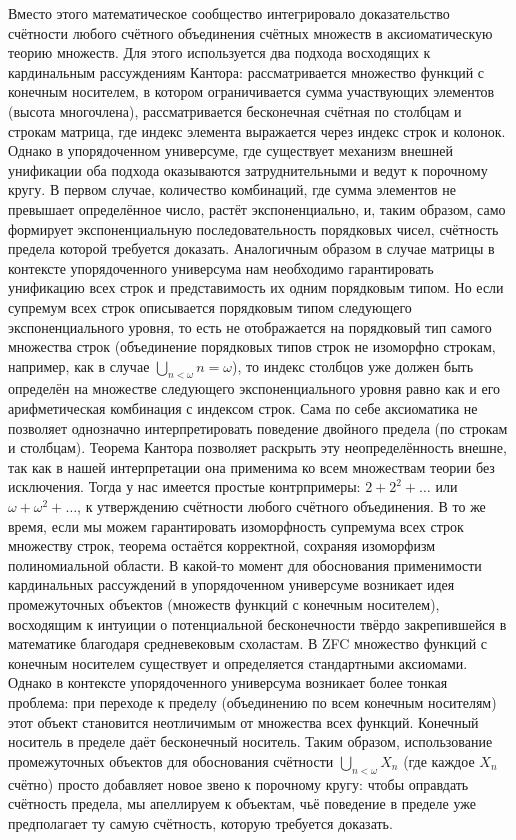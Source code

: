 \documentclass[12pt]{article}
\begin{document}
Вместо этого математическое сообщество интегрировало доказательство счётности любого счётного объединения счётных множеств в аксиоматическую теорию множеств. Для этого используется два подхода восходящих к кардинальным рассуждениям Кантора: рассматривается множество функций с конечным носителем, в котором ограничивается сумма участвующих элементов (высота многочлена), рассматривается бесконечная счётная по столбцам и строкам матрица, где индекс элемента выражается через индекс строк и колонок. Однако в упорядоченном универсуме, где существует механизм внешней унификации оба подхода оказываются затруднительными и ведут к порочному кругу. В первом случае, количество комбинаций, где сумма элементов не превышает определённое число, растёт экспоненциально, и, таким образом, само формирует экспоненциальную последовательность порядковых чисел, счётность предела которой требуется доказать. Аналогичным образом в случае матрицы в контексте упорядоченного универсума нам необходимо гарантировать унификацию всех строк и представимость их одним порядковым типом. Но если супремум всех строк описывается порядковым типом следующего экспоненциального уровня, то есть не отображается на порядковый тип самого множества строк (объединение порядковых типов строк не изоморфно строкам, например, как в случае $\bigcup_{n < \omega} n = \omega$), то индекс столбцов уже должен быть определён на множестве следующего экспоненциального уровня равно как и его арифметическая комбинация с индексом строк. Сама по себе аксиоматика не позволяет однозначно интерпретировать поведение двойного предела (по строкам и столбцам). Теорема Кантора позволяет раскрыть эту неопределённость внешне, так как в нашей интерпретации она применима ко всем множествам теории без исключения. Тогда у нас имеется простые контрпримеры: $2 + 2^2 + \dots$ или $\omega + \omega^2 + \dots$, к утверждению счётности любого счётного объединения. В то же время, если мы можем гарантировать изоморфность супремума всех строк множеству строк, теорема остаётся корректной, сохраняя изоморфизм полиномиальной области. В какой-то момент для обоснования применимости кардинальных рассуждений в упорядоченном универсуме возникает идея промежуточных объектов (множеств функций с конечным носителем), восходящим к интуиции о потенциальной бесконечности твёрдо закрепившейся в математике благодаря средневековым схоластам. В ZFC множество функций с конечным носителем существует и определяется стандартными аксиомами. Однако в контексте упорядоченного универсума возникает более тонкая проблема: при переходе к пределу (объединению по всем конечным носителям) этот объект становится неотличимым от множества всех функций. Конечный носитель в пределе даёт бесконечный носитель. Таким образом, использование промежуточных объектов для обоснования счётности $\bigcup_{n < \omega} X_n$ (где каждое $X_n$ счётно) просто добавляет новое звено к порочному кругу: чтобы оправдать счётность предела, мы апеллируем к объектам, чьё поведение в пределе уже предполагает ту самую счётность, которую требуется доказать.
\end{document}
